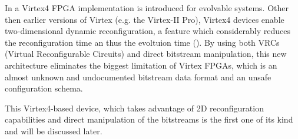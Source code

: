 
In \cite{virtex4} a Virtex4 FPGA implementation is introduced for evolvable systems. Other then earlier versions of Virtex (e.g. the Virtex-II Pro), Virtex4 devices enable two-dimensional dynamic reconfiguration, a feature which considerably reduces the reconfiguration time an thus the evoltuion time (\cite{virtex4}). By using both VRCs (Virtual Reconfigurable Circuits) and direct bitstream manipulation, this new architecture eliminates the biggest limitation of Virtex FPGAs, which is an almost unknown and undocumented bitstream data format and an unsafe configuration schema. 

This Virtex4-based device, which takes advantage of 2D reconfiguration capabilities and direct manipulation of the bitstreams is the first one of its kind and will be discussed later.